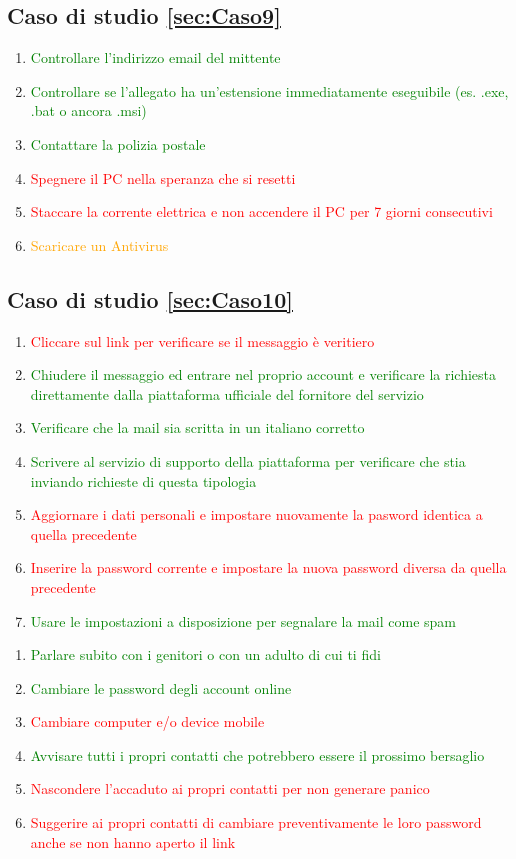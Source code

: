 \documentclass{article}
\begin{document}
\subsection{Caso di studio \ref{sec:Caso9}}
\begin{enumerate}
	\item \textcolor{green}{Controllare l'indirizzo email del mittente}	
	\item \textcolor{green}{Controllare se l’allegato ha un'estensione immediatamente eseguibile (es. .exe, .bat o ancora .msi)}	
	\item \textcolor{green}{Contattare la polizia postale}
	\item \textcolor{red}{Spegnere il PC nella speranza che si resetti}	
	\item \textcolor{red}{Staccare la corrente elettrica e non accendere il PC per 7 giorni consecutivi}
	\item \textcolor{orange}{Scaricare un Antivirus}
\end{enumerate}
\subsection{Caso di studio \ref{sec:Caso10}}
\begin{enumerate}
	\item \textcolor{red}{Cliccare sul link per verificare se il messaggio è veritiero}
	\item \textcolor{green}{Chiudere il messaggio ed entrare nel proprio account e verificare la richiesta direttamente dalla piattaforma ufficiale del fornitore del servizio}
	\item \textcolor{green}{Verificare che la mail sia scritta in un italiano corretto}
	\item \textcolor{green}{Scrivere al servizio di supporto della piattaforma per verificare che stia inviando richieste di questa tipologia}
	\item \textcolor{red}{Aggiornare i dati personali e impostare nuovamente la pasword identica a quella precedente}
	\item \textcolor{red}{Inserire la password corrente e impostare la nuova password diversa da quella precedente}
	\item \textcolor{green}{Usare le impostazioni a disposizione per segnalare la mail come spam}
\end{enumerate}
\vspace{10mm}
\begin{enumerate}
	\item \textcolor{green}{Parlare subito con i genitori o con un adulto di cui ti fidi}
	\item \textcolor{green}{Cambiare le password degli account online}
	\item \textcolor{red}{Cambiare computer e/o device mobile}
	\item \textcolor{green}{Avvisare tutti i propri contatti che potrebbero essere il prossimo bersaglio}
	\item \textcolor{red}{Nascondere l'accaduto ai propri contatti per non generare panico}
	\item \textcolor{red}{Suggerire ai propri contatti di cambiare preventivamente le loro password anche se non hanno aperto il link}
\end{enumerate}
\end{document}

